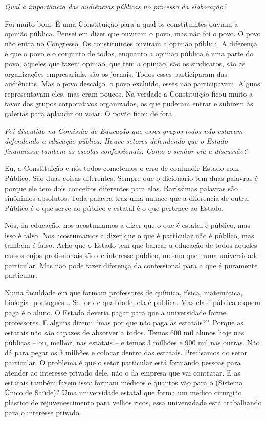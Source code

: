 \noindent\emph{Qual a importância das audiências públicas no processo da
elaboração?}

Foi muito bom. É uma Constituição para a qual os
constituintes ouviam a opinião pública. Pensei em dizer que ouviram o
povo, mas não foi o povo. O povo não entra no Congresso. Os
constituintes ouviram a opinião pública. A diferença é que o povo é o
conjunto de todos, enquanto a opinião pública é uma parte do povo,
aqueles que fazem opinião, que têm a opinião, são os sindicatos, são as
organizações empresariais, são os jornais. Todos esses participaram das
audiências. Mas o povo descalço, o povo excluído, esses não
participavam. Alguns representavam eles, mas eram poucos. Na verdade a
Constituição ficou muito a favor dos grupos corporativos organizados, os
que puderam entrar e subirem às galerias para aplaudir ou vaiar. O povão
ficou de fora.

\medskip

\noindent\emph{Foi discutido na Comissão de Educação que esses grupos todos não
estavam defendendo a educação pública. Houve setores defendendo que o
Estado financiasse também as escolas confessionais. Como o senhor viu a
discussão?}

Eu, a Constituição e nós todos cometemos o erro de
confundir Estado com Público. São duas coisas diferentes. Sempre que o
dicionário tem duas palavras é porque ele tem dois conceitos diferentes
para elas. Raríssimas palavras são sinônimos absolutos. Toda palavra
traz uma nuance que a diferencia de outra. Público é o que serve ao
público e estatal é o que pertence ao Estado.

Nós, da educação, nos acostumamos a dizer que o que é estatal é público,
mas isso é falso. Nos acostumamos a dizer que o que é particular não é
público, mas também é falso. Acho que o Estado tem que bancar a educação
de todos aqueles cursos cujos profissionais são de interesse público,
mesmo que numa universidade particular. Mas não pode fazer diferença da
confessional para a que é puramente particular.

Numa faculdade em que formam professores de química, física, matemática,
biologia, português... Se for de qualidade, ela é pública. Mas ela é
pública e quem paga é o aluno. O Estado deveria pagar para que a
universidade forme professores. E alguns dizem: ``mas por que não paga
às estatais?''. Porque as estatais não são capazes de absorver a todos.
Temos 600 mil alunos hoje nas públicas -- ou, melhor, nas estatais -- e
temos 3 milhões e 900 mil nas outras. Não dá para pegar os 3 milhões e
colocar dentro das estatais. Precisamos do setor particular. O problema
é que o setor particular está formando pessoas para atender ao interesse
privado dele, não o da empresa que vai contratar. E as estatais também
fazem isso: formam médicos e quantos vão para o  (Sistema Único de
Saúde)? Uma universidade estatal que forma um médico cirurgião plástico
de rejuvenescimento para velhos ricos, essa universidade está
trabalhando para o interesse privado.

